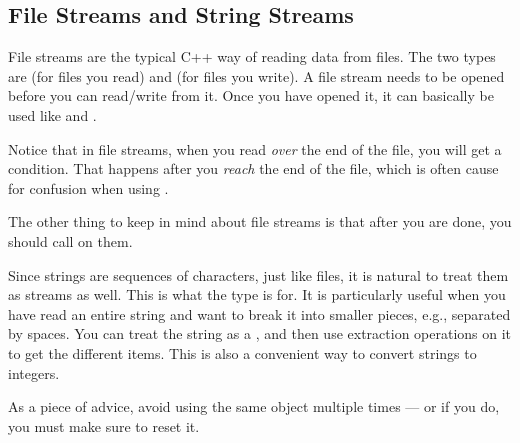 \subsection*{File Streams and String Streams}
File streams are the typical C++ way of reading data from files.
The two types are  (for files you read) and
 (for files you write).
A file stream needs to be opened before you can read/write from it. 
Once you have opened it, it can basically be used like  and
.

Notice that in file streams, when you read \emph{over} the end of the
file, you will get a  condition.
That happens after you \emph{reach} the end of the file,
which is often cause for confusion when using .

The other thing to keep in mind about file streams is that after
you are done, you should call  on them.

\medskip

Since strings are sequences of characters, just like files,
it is natural to treat them as streams as well.
This is what the  type is for.
It is particularly useful when you have read an entire string and want
to break it into smaller pieces, e.g., separated by spaces.
You can treat the string as a , and then use extraction
operations on it to get the different items.
This is also a convenient way to convert strings to integers.

As a piece of advice, avoid using the same  object
multiple times --- or if you do, you must make sure to reset it.